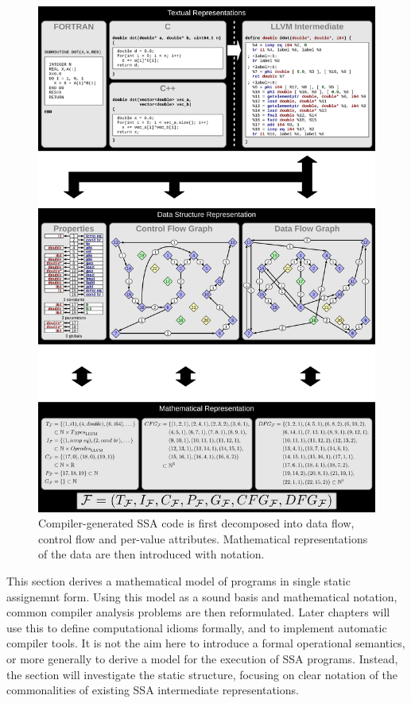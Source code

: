 \begin{figure}[p]
\centering
\includegraphics[width=\textwidth,height=1.5\textwidth]{figures/ssamathmodel.pdf}

\vspace{9.31595pt}
\caption{Compiler-generated SSA code is first decomposed into data flow, control
         flow and per-value attributes.
         Mathematical representations of the data are then introduced with
         notation.}
\label{fig:derivemaths}
\end{figure}

    This section derives a mathematical model of programs in single static
    assignemnt form.
    Using this model as a sound basis and mathematical notation, common compiler
    analysis problems are then reformulated.
    Later chapters will use this to define computational idioms formally, and to
    implement automatic compiler tools.
    It is not the aim here to introduce a formal operational semantics, or more
    generally to derive a model for the execution of SSA programs.
    Instead, the section will investigate the static structure, focusing on
    clear notation of the commonalities of existing SSA intermediate
    representations.

